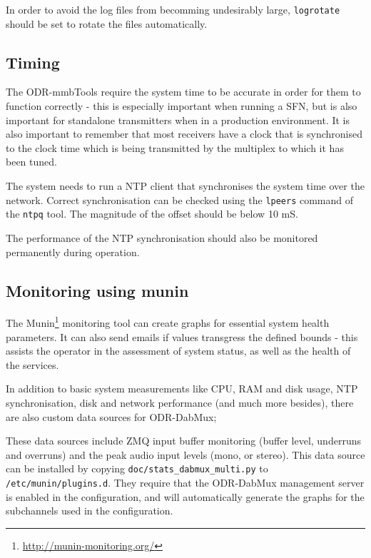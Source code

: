 
In order to avoid the log files from becomming undesirably large, \texttt{logrotate}
should be set to rotate the files automatically. 



\subsection{Timing}
The ODR-mmbTools require the system time to be accurate in order for them to 
function correctly - this is especially important when running a SFN, but is 
also important for standalone transmitters when in a production environment. It
is also important to remember that most receivers have a clock that is 
synchronised to the clock time which is being transmitted by the multiplex to 
which it has been tuned.

The system needs to run a NTP client that synchronises the system time over the
network. Correct synchronisation can be checked using the \texttt{lpeers}
command of the \texttt{ntpq} tool. The magnitude of the offset should be below 
10 mS.

The performance of the NTP synchronisation should also be monitored permanently
during operation.


\subsection{Monitoring using munin}

The Munin\footnote{\url{http://munin-monitoring.org/}} monitoring tool can
create graphs for essential system health parameters. It can also send emails
if values transgress the defined bounds - this assists the operator in the
assessment of system status, as well as the health of the services.

In addition to basic system measurements like CPU, RAM and disk usage, NTP
synchronisation, disk and network performance (and much more besides), there
are also custom data sources for ODR-DabMux;

These data sources include ZMQ input buffer monitoring (buffer level, underruns
and overruns) and the peak audio input levels (mono, or stereo). This data 
source can be installed by copying \verb+doc/stats_dabmux_multi.py+ to
\texttt{/etc/munin/plugins.d}. They require that the ODR-DabMux management
server is enabled in the configuration, and will automatically generate the
graphs for the subchannels used in the configuration.


